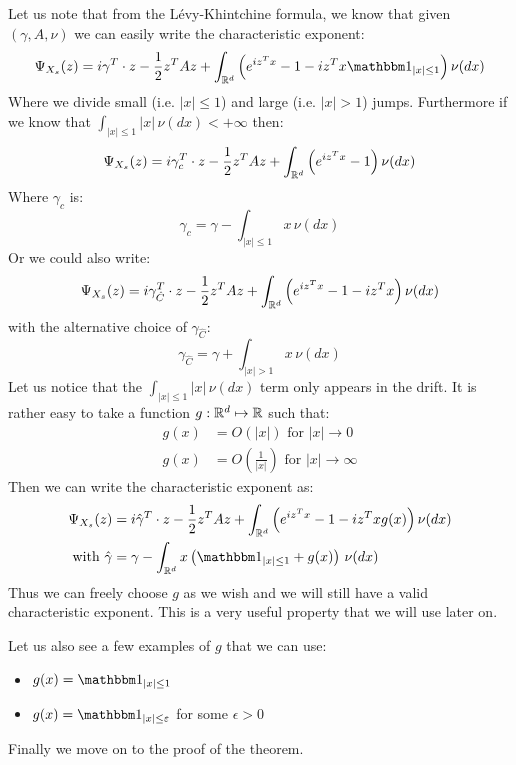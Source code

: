 \begin{remark}
    Let us note that from the L\'evy-Khintchine formula, we know that given 
    $(\gamma, A, \nu)$ we can easily write the characteristic exponent:
    \[ \Psi_{X_s}(z) = i\gamma^T \cdot z - \frac{1}{2} z^T A z + \int_{\R^d}
        \left( e^{iz^T x} - 1 - iz^T x \I_{|x|\leq1} \right) \nu(dx) \]
    Where we divide small (i.e. $|x|\leq1$) and large (i.e. $|x|>1$) jumps.
    Furthermore if we know that $\int_{|x|\leq1} |x| \, \nu(dx) < +\infty$ then:
    \[ \Psi_{X_s}(z) = i\gamma^T_c \cdot z - \frac{1}{2} z^T A z + \int_{\mathbb{R}^d}
        \left( e^{iz^T x} - 1 \right) \nu(dx) \]
    Where $\gamma_c$ is:
    \[ \gamma_c = \gamma - \int_{|x|\leq1} x \, \nu(dx) \]
    Or we could also write:
    \[ \Psi_{X_s}(z) = i\gamma^T_{\hat{C}} \cdot z - \frac{1}{2} z^T A z + \int_{\mathbb{R}^d}
        \left( e^{iz^T x} - 1 - iz^T x \right) \nu(dx) \]
    with the alternative choice of $\gamma_{\hat{C}}$:
    \[ \gamma_{\hat{C}} = \gamma + \int_{|x|>1} x \, \nu(dx) \]
    Let us notice that the $\int_{|x|\leq1} |x| \, \nu(dx)$ term only
    appears in the drift.
    It is rather easy to take a function $g:\mathbb{R}^d\mapsto\mathbb{R}$ such that:
    \begin{align*}
        g(x) &= O\left(|x|\right) \text{ for } |x|\to 0 \\
        g(x) &= O\left(\frac{1}{|x|}\right) \text{ for } |x|\to \infty
    \end{align*}
    Then we can write the characteristic exponent as:
    \begin{align*}
        \Psi_{X_s}(z) & = i\hat{\gamma}^T \cdot z - \frac{1}{2} z^T A z +
        \int_{\R^d} \left( e^{iz^T x} - 1 - iz^T x g(x) \right) \nu(dx) \\
        \text{ with } \hat\gamma & = \gamma - \int_{\R^d} x \left(\I_{|x|\leq1}
        + g(x)\right) \, \nu(dx)
    \end{align*}
    Thus we can freely choose $g$ as we wish and we will still have a valid
    characteristic exponent. This is a very useful property that we will use
    later on.
\end{remark}

Let us also see a few examples of $g$ that we can use:
\begin{itemize}
    \item $g(x) = \I_{|x|\leq1}$
    \item $g(x) = \I_{|x|\leq\epsilon}$ for some $\epsilon > 0$
\end{itemize}

Finally we move on to the proof of the theorem.

